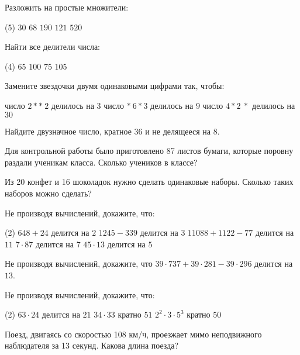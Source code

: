 \begin{homework}[number=2]
	\begin{listofex}
	\item Разложить на простые множители:
	\begin{tasks}(5)
		\task \( 30 \)
		\task \( 68 \)
		\task \( 190 \)
		\task \( 121 \)
		\task \( 520 \)
	\end{tasks}
	\item Найти все делители числа:
	\begin{tasks}(4)
		\task \( 65 \)
		\task \( 100 \)
		\task \( 75 \)
		\task \( 105 \)
	\end{tasks}
	\item Замените звездочки двумя одинаковыми цифрами так, чтобы:
	\begin{tasks}
		\task число \( 2**\:2 \) делилось на \( 3 \)
		\task число \( *\:6*3 \) делилось на \( 9 \)
		\task число \( 4*2\:* \) делилось на \( 30 \)
	\end{tasks}
	\item Найдите двузначное число, кратное 36 и не делящееся на 8.
	\item Для контрольной работы было приготовлено 87 листов бумаги, которые поровну раздали ученикам класса. Сколько учеников в классе?
	\item Из 20 конфет и 16 шоколадок нужно сделать одинаковые наборы. Сколько таких наборов можно сделать?
	\item Не производя вычислений, докажите, что:
	\begin{tasks}(2)
		\task \( 648+24 \) делится на \( 2 \)
		\task \( 1245-339 \) делится на \( 3 \)
		\task \( 11088+1122-77 \) делится на \( 11 \)
		\task \( 7\cdot87 \) делится на \( 7 \)
		\task \( 45\cdot13 \) делится на \( 5 \)
	\end{tasks}
	\item Не производя вычислений, докажите, что \( 39\cdot737+39\cdot281-39\cdot296 \) делится на \( 13 \).
	\item Не производя вычислений, докажите, что:
	\begin{tasks}(2)
		\task \( 63\cdot24 \) делится на \( 21 \)
		\task \( 34\cdot33 \) кратно \( 51 \)
		\task \( 2^2\cdot3\cdot5^3 \) кратно \( 50 \)
	\end{tasks}
	\item Поезд, двигаясь со скоростью 108 км/ч, проезжает мимо неподвижного наблюдателя за 13 секунд. Какова длина поезда?
	\end{listofex}
\end{homework}


